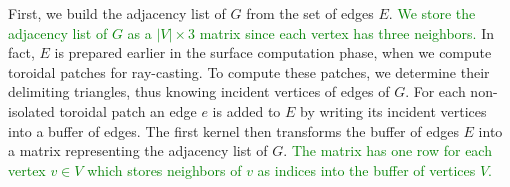 First, we build the adjacency list of $G$ from the set of edges $E$.
\textcolor{green}{We store the adjacency list of $G$ as a $|V| \times 3$ matrix since each vertex has three neighbors.}
In fact, $E$ is prepared earlier in the surface computation phase, when we compute toroidal patches for ray-casting.
To compute these patches, we determine their delimiting triangles, thus knowing incident vertices of edges of $G$.
For each non-isolated toroidal patch an edge $e$ is added to $E$ by writing its incident vertices into a buffer of edges.
The first kernel then transforms the buffer of edges $E$ into a matrix representing the adjacency list of $G$.
\textcolor{green}{The matrix has one row for each vertex $v \in V$ which stores neighbors of $v$ as indices into the buffer of vertices $V$.}


